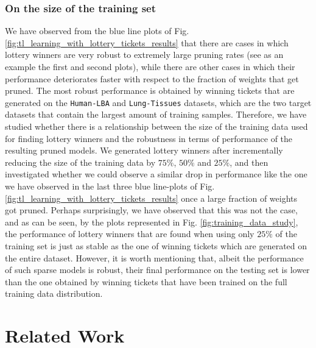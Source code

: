 \subsubsection{On the size of the training set}
We have observed from the blue line plots of Fig. \ref{fig:tl_learning_with_lottery_tickets_results} that there are cases in which lottery winners are very robust to extremely large pruning rates (see as an example the first and second plots), while there are other cases in which their performance deteriorates faster with respect to the fraction of weights that get pruned. The most robust performance is obtained by winning tickets that are generated on the \texttt{Human-LBA} and \texttt{Lung-Tissues} datasets, which are the two target datasets that contain the largest amount of training samples. Therefore, we have studied whether there is a relationship between the size of the training data used for finding lottery winners and the robustness in terms of performance of the resulting pruned models. We generated lottery winners after incrementally reducing the size of the training data by $75\%$, $50\%$ and $25\%$, and then investigated whether we could observe a similar drop in performance like the one we have observed in the last three blue line-plots of Fig. \ref{fig:tl_learning_with_lottery_tickets_results} once a large fraction of weights got pruned. Perhaps surprisingly, we have observed that this was not the case, and as can be seen, by the plots represented in Fig. \ref{fig:training_data_study}, the performance of lottery winners that are found when using only $25\%$ of the training set is just as stable as the one of winning tickets which are generated on the entire dataset. However, it is worth mentioning that, albeit the performance of such sparse models is robust, their final performance on the testing set is lower than the one obtained by winning tickets that have been trained on the full training data distribution.




\section{Related Work}
\label{sec:related_work}

